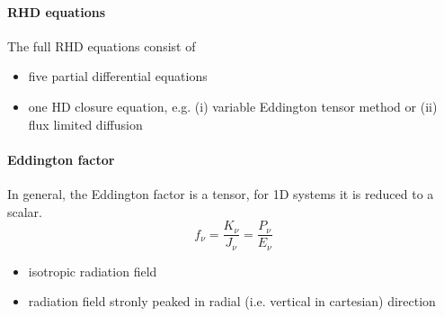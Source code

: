 \documentclass[../main/main.tex]{subfiles}
\begin{document}
\paragraph{RHD equations}
The full RHD equations consist of 
\begin{itemize}
\item five partial differential equations
\item one HD closure equation, e.g. (i) variable Eddington tensor method or (ii) flux limited diffusion
\end{itemize}

\paragraph{Eddington factor}
In general, the Eddington factor is a tensor, for 1D systems it is reduced to a scalar.
\begin{equation}
f_{\nu} = \frac{K_{\nu}}{J_{\nu}} = \frac{P_{\nu}}{E_{\nu}}
\end{equation}
\begin{itemize}
\item isotropic radiation field
\item radiation field stronly peaked in radial (i.e. vertical in cartesian) direction
\end{itemize}
\end{document}
